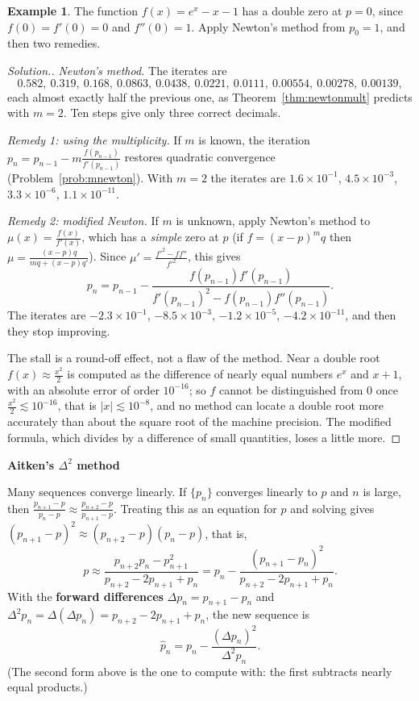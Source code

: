 \documentclass[11pt,a4paper]{article}
\numberwithin{equation}{section}
\theoremstyle{definition}
\newtheorem{exa}[thm]{Example}
\newenvironment{solution}
  {\renewcommand{\qedsymbol}{}\begin{proof}[\textit{Solution}.]}
  {\end{proof}}
\newcommand{\subhead}[1]{%
  \par\medskip\noindent\textbf{#1}\par\nobreak\smallskip}
\begin{document}
\begin{exa}
\label{exa:double}
The function $f(x) = e^x-x-1$ has a double zero at $p = 0$, since $f(0) = f'(0) = 0$ and $f''(0) = 1$. Apply Newton's method from
$p_0 = 1$, and then two remedies.
\end{exa}

\begin{solution}
\emph{Newton's method.} The iterates are
$$0.582,\ 0.319,\ 0.168,\ 0.0863,\ 0.0438,\ 0.0221,\ 0.0111,\ 0.00554,\ 0.00278,\ 0.00139,$$
each almost exactly half the previous one, as Theorem~\ref{thm:newtonmult} predicts with $m = 2$. Ten steps give only three correct
decimals.

\emph{Remedy 1: using the multiplicity.} If $m$ is known, the iteration $p_n = p_{n-1}-m\frac{f(p_{n-1})}{f'(p_{n-1})}$ restores quadratic
convergence (Problem~\ref{prob:mnewton}). With $m = 2$ the iterates are $1.6\times10^{-1}$, $4.5\times10^{-3}$, $3.3\times10^{-6}$,
$1.1\times10^{-11}$.

\emph{Remedy 2: modified Newton.} If $m$ is unknown, apply Newton's method to $\mu(x) = \frac{f(x)}{f'(x)}$, which has a \emph{simple}
zero at $p$ (if $f = (x-p)^mq$ then $\mu = \frac{(x-p)q}{mq+(x-p)q'}$). Since $\mu' = \frac{f'^2-ff''}{f'^2}$, this gives
$$p_n = p_{n-1}-\frac{f(p_{n-1})f'(p_{n-1})}{f'(p_{n-1})^2-f(p_{n-1})f''(p_{n-1})} .$$
The iterates are $-2.3\times10^{-1}$, $-8.5\times10^{-3}$, $-1.2\times10^{-5}$, $-4.2\times10^{-11}$, and then they stop improving.

The stall is a round-off effect, not a flaw of the method. Near a double root $f(x)\approx\frac{x^2}{2}$ is computed as the difference of
nearly equal numbers $e^x$ and $x+1$, with an absolute error of order $10^{-16}$; so $f$ cannot be distinguished from $0$ once
$\frac{x^2}{2}\lesssim10^{-16}$, that is $|x|\lesssim10^{-8}$, and no method can locate a double root more accurately than about the square
root of the machine precision. The modified formula, which divides by a difference of small quantities, loses a little more.
\end{solution}

\subhead{Aitken's $\Delta^2$ method}
Many sequences converge linearly. If $\{p_n\}$ converges linearly to $p$ and $n$ is large, then
$\frac{p_{n+1}-p}{p_n-p}\approx\frac{p_{n+2}-p}{p_{n+1}-p}$. Treating this as an equation for $p$ and solving gives
$(p_{n+1}-p)^2\approx(p_{n+2}-p)(p_n-p)$, that is,
$$p\approx\frac{p_{n+2}p_n-p_{n+1}^2}{p_{n+2}-2p_{n+1}+p_n} = p_n-\frac{(p_{n+1}-p_n)^2}{p_{n+2}-2p_{n+1}+p_n} .$$
With the \textbf{forward differences} $\Delta p_n = p_{n+1}-p_n$ and $\Delta^2p_n = \Delta(\Delta p_n) = p_{n+2}-2p_{n+1}+p_n$, the new sequence is
\begin{equation}\label{eq:aitken}
\hat p_n = p_n-\frac{(\Delta p_n)^2}{\Delta^2p_n} .
\end{equation}
(The second form above is the one to compute with: the first subtracts nearly equal products.)
\end{document}

